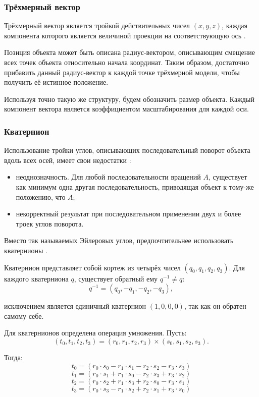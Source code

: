 \subsubsection{Трёхмерный вектор}
Трёхмерный вектор является тройкой действительных чисел $(x, y, z)$, каждая компонента которого является величиной проекции на соответствующую ось \cite{bib:vector}.

Позиция объекта может быть описана радиус-вектором, описывающим смещение всех точек объекта относительно начала координат. Таким образом, достаточно прибавить данный радиус-вектор к каждой точке трёхмерной модели, чтобы получить её истинное положение.

Используя точно такую же структуру, будем обозначить размер объекта. Каждый компонент вектора является коэффициентом масштабирования для каждой оси.

\subsubsection{Кватернион}
Использование тройки углов, описывающих последовательный поворот объекта вдоль всех осей, имеет свои недостатки \cite{bib:euler_problems}:
\begin{itemize}
	\item неоднозначность. Для любой последовательности вращений $A$, существует как минимум одна другая последовательность, приводящая объект к тому-же положению, что $A$;
	\item некорректный результат при последовательном применении двух и более троек углов поворота.
\end{itemize}

Вместо так называемых Эйлеровых углов, предпочтительнее использовать кватернионы \cite{bib:quaternions}.

Кватернион представляет собой кортеж из четырёх чисел $(q_0, q_1, q_2, q_3)$. Для каждого кватерниона $q$, существует обратный ему $q^{-1}\ne q$:
\begin{equation}
	q^{-1}=(q_0, -q_1, -q_2, -q_3),
\end{equation}

исключением является единичный кватернион $(1, 0, 0, 0)$, так как он обратен самому себе.

Для кватернионов определена операция умножения. Пусть:
\begin{equation}
	(t_0, t_1, t_2, t_3) = (r_0, r_1, r_2, r_3)\times(s_0, s_1, s_2, s_3).
\end{equation}

Тогда:
\begin{equation}
	t_0=(r_0\cdot s_0-r_1\cdot s_1-r_2\cdot s_2-r_3\cdot s_3)
\end{equation}
\begin{equation}
	t_1=(r_0\cdot s_1+r_1\cdot s_0-r_2\cdot s_3+r_3\cdot s_2)
\end{equation}
\begin{equation}
	t_2=(r_0\cdot s_2+r_1\cdot s_3+r_2\cdot s_0-r_3\cdot s_1)
\end{equation}
\begin{equation}
	t_3=(r_0\cdot s_3-r_1\cdot s_2+r_2\cdot s_1+r_3\cdot s_0)
\end{equation}


